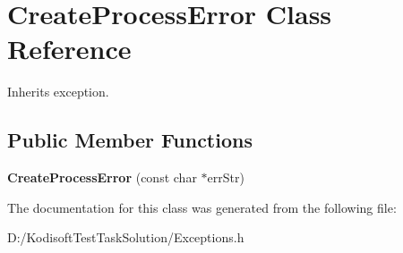 \hypertarget{class_create_process_error}{\section{Create\+Process\+Error Class Reference}
\label{class_create_process_error}
}


Inherits exception.

\subsection*{Public Member Functions}
\begin{DoxyCompactItemize}
\item 
\hypertarget{class_create_process_error_a1c5d338664a7e0014d53635127902f81}{{\bfseries Create\+Process\+Error} (const char $\ast$err\+Str)}\label{class_create_process_error_a1c5d338664a7e0014d53635127902f81}

\end{DoxyCompactItemize}


The documentation for this class was generated from the following file\+:\begin{DoxyCompactItemize}
\item 
D\+:/\+Kodisoft\+Test\+Task\+Solution/Exceptions.\+h\end{DoxyCompactItemize}
